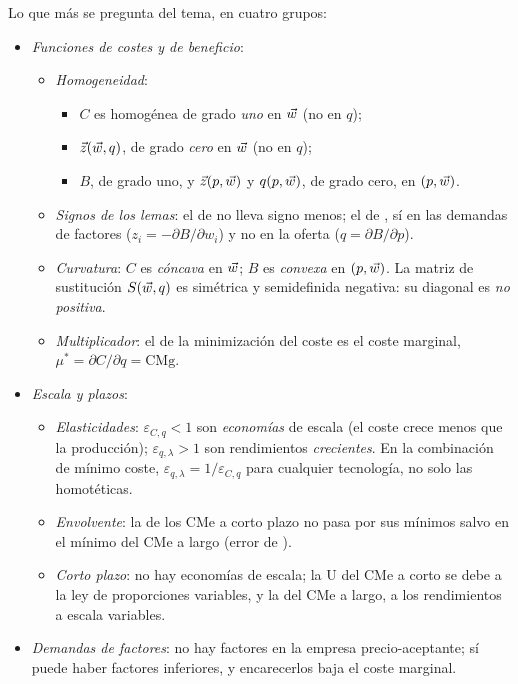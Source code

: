 \documentclass[11pt]{article}
\begin{document}
Lo que más se pregunta del tema, en cuatro grupos:
\begin{itemize}
\item \emph{Funciones de costes y de beneficio}:
  \begin{itemize}
  \item \emph{Homogeneidad}:
    \begin{itemize}
    \item $C$ es homogénea de grado \emph{uno} en $\vec{w}$ (no en $q$);
    \item $\vec{z}(\vec{w},q)$, de grado \emph{cero} en $\vec{w}$ (no en $q$);
    \item $B$, de grado uno, y $\vec{z}(p,\vec{w})$ y $q(p,\vec{w})$, de grado cero, en $(p,\vec{w})$.
    \end{itemize}
  \item \emph{Signos de los lemas}: el de  no lleva signo menos; el de , sí en las demandas de factores ($z_i=-\partial B/\partial w_i$) y no en la oferta ($q=\partial B/\partial p$).
  \item \emph{Curvatura}: $C$ es \emph{cóncava} en $\vec{w}$; $B$ es \emph{convexa} en $(p,\vec{w})$. La matriz de sustitución $S(\vec{w},q)$ es simétrica y semidefinida negativa: su diagonal es \emph{no positiva}.
  \item \emph{Multiplicador}: el de la minimización del coste es el coste marginal, $\mu^*=\partial C/\partial q=\mathrm{CMg}$.
  \end{itemize}
\item \emph{Escala y plazos}:
  \begin{itemize}
  \item \emph{Elasticidades}: $\varepsilon_{C,q}<1$ son \emph{economías} de escala (el coste crece menos que la producción); $\varepsilon_{q,\lambda}>1$ son rendimientos \emph{crecientes}. En la combinación de mínimo coste, $\varepsilon_{q,\lambda}=1/\varepsilon_{C,q}$ para cualquier tecnología, no solo las homotéticas.
  \item \emph{Envolvente}: la de los CMe a corto plazo no pasa por sus mínimos salvo en el mínimo del CMe a largo (error de ).
  \item \emph{Corto plazo}: no hay economías de escala; la U del CMe a corto se debe a la ley de proporciones variables, y la del CMe a largo, a los rendimientos a escala variables.
  \end{itemize}
\item \emph{Demandas de factores}: no hay factores  en la empresa precio-aceptante; sí puede haber factores inferiores, y encarecerlos baja el coste marginal.

\end{itemize}
\end{document}
